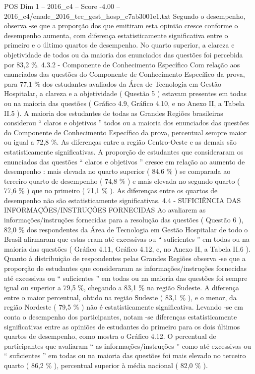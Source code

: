 \begin{textsample}{POS Dim 1 – 2016\_c4 – Score -4.00 – 2016\_c4/enade\_2016\_tec\_gest\_hosp\_c7ab3001e1.txt}
Segundo o desempenho, observa -se que a proporção dos que emitiram esta opinião cresce conforme o desempenho aumenta, com diferença estatisticamente significativa entre o primeiro e o último quartos de desempenho.
No quarto superior, a clareza e objetividade de todos ou da maioria dos enunciados das questões foi percebida por 83,2 \%. 4.3.2 - Componente de Conhecimento Específico Com relação aos enunciados das questões do Componente de Conhecimento Específico da prova, para 77,1 \% dos estudantes avaliados da Área de Tecnologia em Gestão Hospitalar, a clareza e a objetividade ( Questão 5 ) estavam presentes em todas ou na maioria das questões ( Gráfico 4.9, Gráfico 4.10, e no Anexo II, a Tabela II.5 ).
A maioria dos estudantes de todas as Grandes Regiões brasileiras considerou “ claros e objetivos ” todos ou a maioria dos enunciados das questões do Componente de Conhecimento Específico da prova, percentual sempre maior ou igual a 72,8 \%.
As diferenças entre a região Centro-Oeste e as demais são estatisticamente significativas.
A proporção de estudantes que consideraram os enunciados das questões “ claros e objetivos ” cresce em relação ao aumento de desempenho : mais elevada no quarto superior ( 84,6 \% ) se comparada ao terceiro quarto de desempenho ( 74,8 \% ) e mais elevada no segundo quarto ( 77,6 \% ) que no primeiro ( 71,1 \% ).
As diferenças entre os quartos de desempenho não são estatisticamente significativas. 4.4 - SUFICIÊNCIA DAS INFORMAÇÕES/INSTRUÇÕES FORNECIDAS Ao avaliarem as informações/instruções fornecidas para a resolução das questões ( Questão 6 ), 82,0 \% dos respondentes da Área de Tecnologia em Gestão Hospitalar de todo o Brasil afirmaram que estas eram até excessivas ou “ suficientes ” em todas ou na maioria das questões ( Gráfico 4.11, Gráfico 4.12, e, no Anexo II, a Tabela II.6 ).
Quanto à distribuição de respondentes pelas Grandes Regiões observa -se que a proporção de estudantes que consideraram as informações/instruções fornecidas até excessivas ou “ suficientes ” em todas ou na maioria das questões foi sempre igual ou superior a 79,5 \%, chegando a 83,1 \% na região Sudeste.
A diferença entre o maior percentual, obtido na região Sudeste ( 83,1 \% ), e o menor, da região Nordeste ( 79,5 \% ) não é estatisticamente significativa.
Levando -se em conta o desempenho dos participantes, notam -se diferenças estatisticamente significativas entre as opiniões de estudantes do primeiro para os dois últimos quartos de desempenho, como mostra o Gráfico 4.12.
O percentual de participantes que avaliaram “ as informações/instruções ” como até excessivas ou “ suficientes ” em todas ou na maioria das questões foi mais elevado no terceiro quarto ( 86,2 \% ), percentual superior à média nacional ( 82,0 \% ).

\end{textsample}
